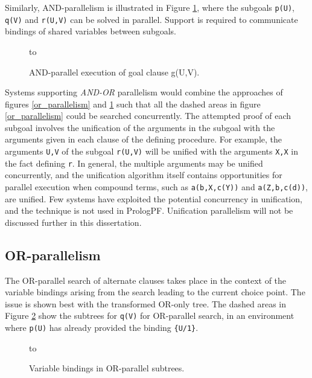 Similarly, AND-parallelism is illustrated in Figure \ref{and_parallelism}, where
the subgoals \texttt{p(U)}, \texttt{q(V)} and \texttt{r(U,V)} can be solved in
parallel.  Support is required to communicate bindings of shared variables
between subgoals.

\begin{figure}[h]
\vspace{5mm} \hbox to 
\caption{AND-parallel execution of goal clause g(U,V).}
\vspace{5mm}
\label{and_parallelism}
\end{figure}

Systems supporting \textit{AND-OR} parallelism would combine the approaches of
figures \ref{or_parallelism} and \ref{and_parallelism} such that all the
dashed areas in figure \ref{or_parallelism} could be searched concurrently.
The attempted proof of each subgoal involves the unification of the arguments
in the subgoal with the arguments given in each clause of the defining
procedure. For example, the arguments \texttt{U,V} of the subgoal \texttt{r(U,V)}
will be unified with the arguments \texttt{X,X} in the fact defining \texttt{r}.
In general, the multiple arguments may be unified concurrently, and the
unification algorithm itself contains opportunities for parallel execution when
compound terms, such as \texttt{a(b,X,c(Y))} and \texttt{a(Z,b,c(d))}, are
unified.  Few systems have exploited the potential concurrency in unification,
and the technique is not used in PrologPF.  Unification parallelism will not be
discussed further in this dissertation.

\subsection{OR-parallelism}

The OR-parallel search of alternate clauses takes place in the context of
the variable bindings arising from the search leading to the current choice point.
The issue is shown best with the transformed OR-only tree. 
The dashed areas in Figure \ref{or_context}
show the subtrees for \texttt{q(V)} for OR-parallel search, in an environment
where \texttt{p(U)} has already provided the binding \texttt{\{U/1\}}.

\begin{figure}[h]
\vspace{5mm} \hbox to 
\caption{Variable bindings in OR-parallel subtrees.}
\vspace{5mm}
\label{or_context}
\end{figure}


